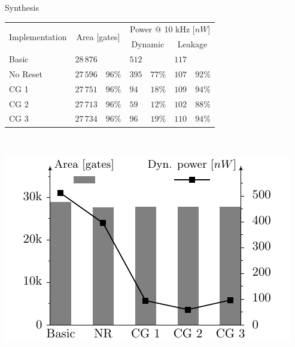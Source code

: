 \documentclass[svgnames]{beamer}
\newenvironment{changemargin}[2]{%
\begin{list}{}{%
\setlength{\topsep}{0pt}%
\setlength{\leftmargin}{#1}%
\setlength{\rightmargin}{#2}%
\setlength{\listparindent}{\parindent}%
\setlength{\itemindent}{\parindent}%
\setlength{\parsep}{\parskip}%
}%
\item[]}{\end{list}}
\begin{document}
\begin{frame}{Synthesis}
	\begin{center}
		\tiny{\begin{tabular}{llrlrlr}
			\\[-2em]
			\toprule
			\multirow{2}{*}{Implementation}	& \multicolumn{2}{c}{\multirow{2}{*}{Area [gates]}}	& \multicolumn{4}{c}{Power @ 10 kHz [$nW$]}\\
			\cmidrule{4-7}
			&	& & \multicolumn{2}{c}{Dynamic}	& \multicolumn{2}{c}{Leakage}\\
			\midrule
			Basic			& $28\,876$	& 			& $512$	&	 		& $117$ 	& \\
			No Reset		& $27\,596$	& $96\%$	& $395$	& $77\%$	& $107$ 	& $92\%$\\
			CG 1			& $27\,751$	& $96\%$	& $94$	& $18\%$	& $109$	& $94\%$\\
			CG 2			& $27\,713$	& $96\%$	& $59$	& $12\%$	& $102$	& $88\%$\\
			CG 3			& $27\,734$	& $96\%$	& $96$	& $19\%$	& $110$	& $94\%$\\
			\bottomrule		
		\end{tabular}}

		\\[2em]

		\begin{changemargin}{-1cm}{-1cm}\begin{center}
			\includegraphics[width=0.45\paperwidth]{images/results-m1-en}
		\end{center}\end{changemargin}
	\end{center}
\end{frame}
\end{document}
